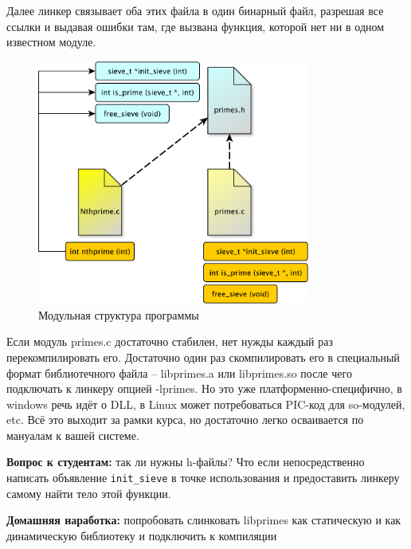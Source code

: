 \documentclass[a4paper,12pt,oneside]{article}
\newif\ifanswers
\begin{document}
Далее линкер связывает оба этих файла в один бинарный файл, разрешая все ссылки и выдавая ошибки там, где вызвана функция, которой нет ни в одном известном модуле.

\begin{figure}[ht]
\centering
\includegraphics[width=0.8\textwidth]{illustrations/module-structure-crop.pdf}
\caption{Модульная структура программы}
\label{fig:module_struct}
\end{figure}

Если модуль primes.c достаточно стабилен, нет нужды каждый раз перекомпилировать его. Достаточно один раз скомпилировать его в специальный формат библиотечного файла -- libprimes.a или libprimes.so после чего подключать к линкеру опцией -lprimes. Но это уже платформенно-специфично, в windows речь идёт о DLL, в Linux может потребоваться PIC-код для so-модулей, etc. Всё это выходит за рамки курса, но достаточно легко осваивается по мануалам к вашей системе.

\textbf{Вопрос к студентам:} так ли нужны h-файлы? Что если непосредственно написать объявление \lstinline!init_sieve! в точке использования и предоставить линкеру самому найти тело этой функции.

\ifanswers
Правильный ответ: формально да, так можно сделать. Но реально единые заголовочники помогают бороться с человеческими ошибками. Когда изменяются типы параметров в точке определения, компилятор подскажет несоответствие заголовочнику и все места где их надо изменить в точке использования. Если же заголовочника не будет а программист забудет это сделать, будет тихое UB
\fi

\textbf{Домашняя наработка:} попробовать слинковать libprimes как статическую и как динамическую библиотеку и подключить к компиляции
\end{document}
